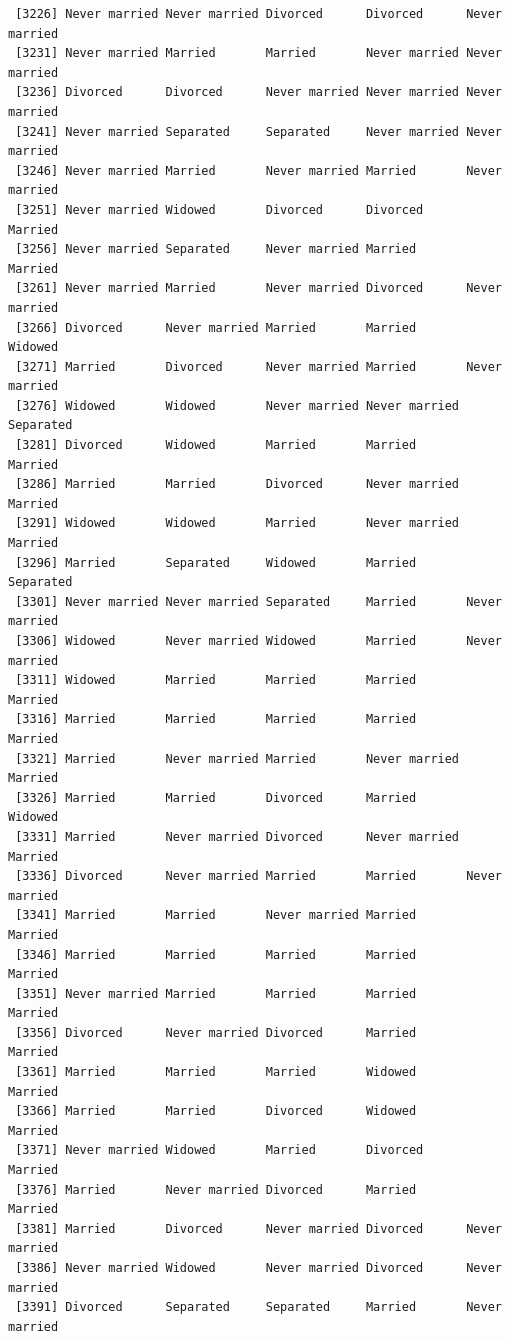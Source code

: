 \documentclass[
  letterpaper,
  DIV=11,
  numbers=noendperiod,
  oneside]{scrartcl}
\begin{document}
\begin{verbatim}
 [3226] Never married Never married Divorced      Divorced      Never married
 [3231] Never married Married       Married       Never married Never married
 [3236] Divorced      Divorced      Never married Never married Never married
 [3241] Never married Separated     Separated     Never married Never married
 [3246] Never married Married       Never married Married       Never married
 [3251] Never married Widowed       Divorced      Divorced      Married      
 [3256] Never married Separated     Never married Married       Married      
 [3261] Never married Married       Never married Divorced      Never married
 [3266] Divorced      Never married Married       Married       Widowed      
 [3271] Married       Divorced      Never married Married       Never married
 [3276] Widowed       Widowed       Never married Never married Separated    
 [3281] Divorced      Widowed       Married       Married       Married      
 [3286] Married       Married       Divorced      Never married Married      
 [3291] Widowed       Widowed       Married       Never married Married      
 [3296] Married       Separated     Widowed       Married       Separated    
 [3301] Never married Never married Separated     Married       Never married
 [3306] Widowed       Never married Widowed       Married       Never married
 [3311] Widowed       Married       Married       Married       Married      
 [3316] Married       Married       Married       Married       Married      
 [3321] Married       Never married Married       Never married Married      
 [3326] Married       Married       Divorced      Married       Widowed      
 [3331] Married       Never married Divorced      Never married Married      
 [3336] Divorced      Never married Married       Married       Never married
 [3341] Married       Married       Never married Married       Married      
 [3346] Married       Married       Married       Married       Married      
 [3351] Never married Married       Married       Married       Married      
 [3356] Divorced      Never married Divorced      Married       Married      
 [3361] Married       Married       Married       Widowed       Married      
 [3366] Married       Married       Divorced      Widowed       Married      
 [3371] Never married Widowed       Married       Divorced      Married      
 [3376] Married       Never married Divorced      Married       Married      
 [3381] Married       Divorced      Never married Divorced      Never married
 [3386] Never married Widowed       Never married Divorced      Never married
 [3391] Divorced      Separated     Separated     Married       Never married

\end{verbatim}
\end{document}
